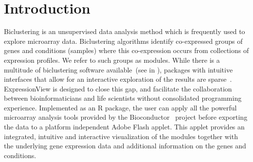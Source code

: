 \documentclass[round]{bioinfo}
\begin{document}
\vspace*{-7pt}
\section{Introduction}
Biclustering is an unsupervised data analysis method which is
frequently used to explore microarray data. Biclustering algorithms
identify co-expressed groups of
genes and conditions (samples) where this co-expression occurs from
collections of expression profiles. We refer to such groups as modules. While 
there is a multitude of biclustering software available~(see in
\cite{madeira04,ihmels04}), packages with intuitive interfaces that
allow for an interactive exploration of the results are
sparse~\citep{santamaria08}. ExpressionView is designed to close this
gap, and facilitate the collaboration between bioinformaticians and
life scientists without consolidated programming
experience. Implemented as an R package, the user can apply all the
powerful microarray analysis tools provided by the
Bioconductor~\citep{gentleman04} project before exporting the data to
a platform independent Adobe Flash applet. This applet
provides an integrated, intuitive and interactive visualization of
the modules together with the underlying gene expression data and
additional information on the genes and conditions.

\vspace*{-7pt}
\end{document}
